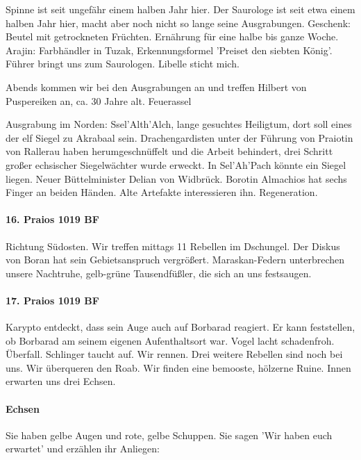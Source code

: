 Spinne ist seit ungefähr einem halben Jahr hier. Der Saurologe ist seit etwa einem halben Jahr hier, macht aber noch nicht so lange seine Ausgrabungen. Geschenk: Beutel mit getrockneten Früchten. Ernährung für eine halbe bis ganze Woche. Arajin: Farbhändler in Tuzak, Erkennungsformel 'Preiset den siebten König'. Führer bringt uns zum Saurologen. Libelle sticht mich. 

Abends kommen wir bei den Ausgrabungen an und treffen Hilbert von Puspereiken an, ca. 30 Jahre alt.  Feuerassel

Ausgrabung im Norden: Ssel'Alth'Alch, lange gesuchtes Heiligtum, dort soll eines der elf Siegel zu Akrabaal sein. Drachengardisten unter der Führung von Praiotin von Rallerau haben herumgeschnüffelt und die Arbeit behindert, drei Schritt großer echsischer Siegelwächter wurde erweckt. In Sel'Ah'Pach könnte ein Siegel liegen. Neuer Büttelminister Delian von Widbrück. Borotin Almachios hat sechs Finger an beiden Händen. Alte Artefakte interessieren ihn.  
 Regeneration. 

\paragraph{16. Praios 1019 BF}
\label{sec:16.-praios-1019}
Richtung Südosten. Wir treffen mittags 11 Rebellen im Dschungel. Der Diskus von Boran hat sein Gebietsanspruch vergrößert. Maraskan-Federn unterbrechen unsere Nachtruhe, gelb-grüne Tausendfüßler, die sich an uns festsaugen. 

\paragraph{17. Praios 1019 BF}
\label{sec:17.-praios-1019}
Karypto entdeckt, dass sein Auge auch auf Borbarad reagiert. Er kann feststellen, ob Borbarad am seinem eigenen Aufenthaltsort war. Vogel lacht schadenfroh. Überfall. Schlinger taucht auf. Wir rennen. Drei weitere Rebellen sind noch bei uns. Wir überqueren den Roab. Wir finden eine bemooste, hölzerne Ruine. Innen erwarten uns drei Echsen.
\paragraph{Echsen}
\label{sec:echsen}

Sie haben gelbe Augen und rote, gelbe Schuppen. Sie sagen 'Wir haben euch erwartet' und erzählen ihr Anliegen: 

